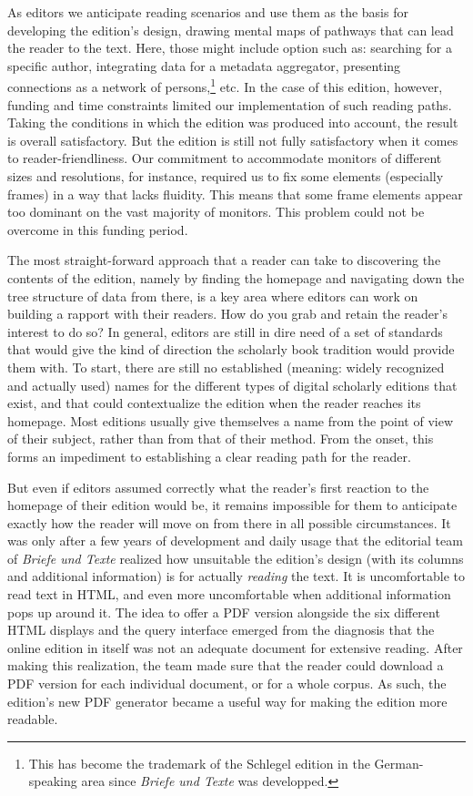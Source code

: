 \begin{paper}
As editors we anticipate reading scenarios and use them as the basis
for developing the edition's design, drawing mental maps of pathways that can lead the reader to the
text. Here, those might include option such as: searching for a specific author, integrating data for a metadata aggregator,
presenting connections as a network of persons,\footnote{This has become the trademark of
the Schlegel edition in the German-speaking area since \emph{Briefe und
Texte} was developped.} etc. In the case of this edition, however, funding and time constraints
limited our implementation of such reading paths. Taking the conditions in which the edition was
produced into account, the result is overall satisfactory. But the edition is still not fully
satisfactory when it comes to reader-friendliness. Our commitment to accommodate monitors of different sizes and resolutions, 
for instance, required us to fix some
elements (especially frames) in  a way that 
 lacks fluidity. This means that some frame elements appear too dominant on the
vast majority of monitors. This problem could not be overcome in this
funding period. 

The most straight-forward approach that a reader can take to discovering the contents of the
edition, namely by finding the homepage and navigating down the tree structure of data
from there, is a key area where editors can work on building a rapport with their
readers. How do you grab and retain the reader's interest to do so? 
In general, editors are still in dire need of a set of standards that would
give the kind of direction the scholarly book tradition would provide them with.
To start, there are still no established (meaning: widely recognized and actually
used) names for the different types of digital scholarly editions that
exist, and that could contextualize the edition when the reader reaches its
homepage. Most editions usually give themselves a name
from the point of view of their subject, rather than from that of their
method. From the onset, this forms an impediment to establishing a clear reading path for the reader.

But even if editors assumed correctly what the reader's first reaction to the homepage of their edition would be,
it remains impossible for them to anticipate exactly how the reader will move on from there in all possible circumstances. 
It was only after a few years of development and daily
usage that the editorial team of \emph{Briefe und Texte} realized how
unsuitable the edition's design (with its columns and additional
information) is for actually \emph{reading} the text. It is
uncomfortable to read text in HTML, and even more uncomfortable when
additional information pops up around it. The idea to offer a PDF version
alongside the six different HTML displays and the query interface
emerged from the diagnosis that the online edition in itself was not an adequate document for
extensive reading. After making this realization, the team made sure that the reader could download a PDF version for each individual
document, or for a whole corpus. As such, the edition's new PDF generator became a useful way for making the edition more readable.


\end{paper}
